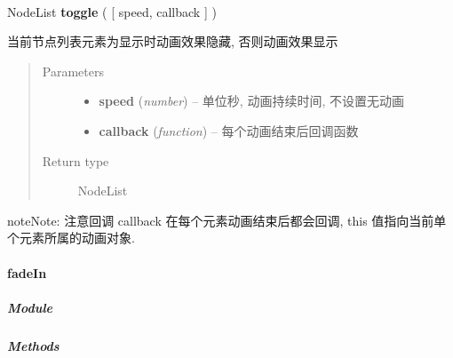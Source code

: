 \documentclass[letterpaper,10pt,english]{sphinxmanual}
\begin{document}
\begin{fulllineitems}
\label{api/core/node/toggle:Node.toggle}~
\begin{DUlineblock}{0em}
\item[] NodeList \textbf{toggle} ( {[} speed, callback {]} )
\item[] 当前节点列表元素为显示时动画效果隐藏, 否则动画效果显示
\end{DUlineblock}
\begin{quote}\begin{description}
\item[{Parameters}] \leavevmode\begin{itemize}
\item {}
\textbf{speed} (\emph{number}) -- 单位秒, 动画持续时间, 不设置无动画

\item {}
\textbf{callback} (\emph{function}) -- 每个动画结束后回调函数

\end{itemize}

\item[{Return type}] \leavevmode
NodeList

\end{description}\end{quote}

\begin{notice}{note}{Note:}
注意回调 callback 在每个元素动画结束后都会回调,  this 值指向当前单个元素所属的动画对象.
\end{notice}

\end{fulllineitems}



\paragraph{fadeIn}
\label{api/core/node/fadeIn::doc}\label{api/core/node/fadeIn:fadein}

\subparagraph{Module}
\label{api/core/node/fadeIn:module}\begin{quote}

{\hyperref[api/core/node/index:module-Node]{}}
\end{quote}


\subparagraph{Methods}
\label{api/core/node/fadeIn:methods}
\end{document}

